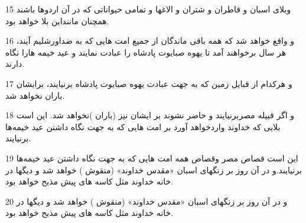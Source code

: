 \par 15 وبلای اسبان و قاطران و شتران و الاغها و تمامی حیواناتی که در آن اردوها باشند همچنان ماننداین بلا خواهد بود.
\par 16 و واقع خواهد شد که همه باقی ماندگان از جمیع امت هایی که به ضداورشلیم آیند، هر سال برخواهند آمد تا یهوه صبایوت پادشاه را عبادت نمایند و عید خیمه هارا نگاه دارند.
\par 17 و هرکدام از قبایل زمین که به جهت عبادت یهوه صبایوت پادشاه برنیایند، برایشان باران نخواهد شد.
\par 18 و اگر قبیله مصربرنیایند و حاضر نشوند بر ایشان نیز (باران )نخواهد شد. این است بلایی که خداوند واردخواهد آورد بر امت هایی که به جهت نگاه داشتن عید خیمه‌ها برنیایند.
\par 19 این است قصاص مصر وقصاص همه امت هایی که به جهت نگاه داشتن عید خیمه‌ها برنیایند.و در آن روز بر زنگهای اسبان «مقدس خداوند» (منقوش ) خواهد شد و دیگها در خانه خداوند مثل کاسه های پیش مذبح خواهد بود.
\par 20 و در آن روز بر زنگهای اسبان «مقدس خداوند» (منقوش ) خواهد شد و دیگها در خانه خداوند مثل کاسه های پیش مذبح خواهد بود.


